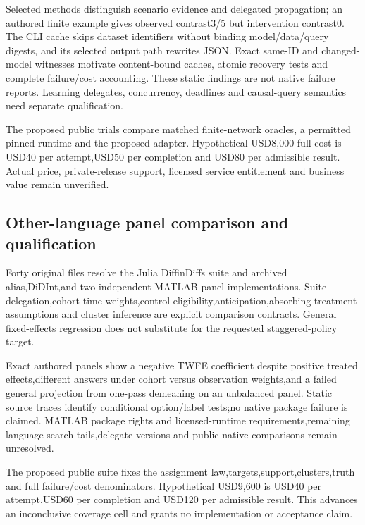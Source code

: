 Selected methods distinguish scenario evidence and delegated
propagation; an authored finite example gives observed contrast3/5 but
intervention contrast0. The CLI cache skips dataset identifiers without
binding model/data/query digests, and its selected output path rewrites
JSON. Exact same-ID and changed-model witnesses motivate content-bound
caches, atomic recovery tests and complete failure/cost accounting.
These static findings are not native failure reports. Learning
delegates, concurrency, deadlines and causal-query semantics need
separate qualification.\citep{exec25_agena_source,exec25_agena_choice}

The proposed public trials compare matched finite-network oracles, a
permitted pinned runtime and the proposed adapter. Hypothetical USD8,000
full cost is USD40 per attempt,USD50 per completion and USD80 per
admissible result. Actual price, private-release support, licensed
service entitlement and business value remain
unverified.\citep{exec25_agena_choice}

\hypertarget{other-language-panel-comparison-and-qualification}{%
\subsection{Other-language panel comparison and
qualification}\label{other-language-panel-comparison-and-qualification}}

Forty original files resolve the Julia DiffinDiffs suite and archived
alias,DiDInt,and two independent MATLAB panel implementations. Suite
delegation,cohort-time weights,control
eligibility,anticipation,absorbing-treatment assumptions and cluster
inference are explicit comparison contracts. General fixed-effects
regression does not substitute for the requested staggered-policy
target.\citep{exec25_panelother_julia,exec25_panelother_didint,exec25_panelother_matlab,exec25_panelother_choice}

Exact authored panels show a negative TWFE coefficient despite positive
treated effects,different answers under cohort versus observation
weights,and a failed general projection from one-pass demeaning on an
unbalanced panel. Static source traces identify conditional option/label
tests;no native package failure is claimed. MATLAB package rights and
licensed-runtime requirements,remaining language search tails,delegate
versions and public native comparisons remain
unresolved.\citep{exec25_panelother_choice}

The proposed public suite fixes the assignment
law,targets,support,clusters,truth and full failure/cost denominators.
Hypothetical USD9,600 is USD40 per attempt,USD60 per completion and
USD120 per admissible result. This advances an inconclusive coverage
cell and grants no implementation or acceptance
claim.\citep{exec25_panelother_choice}

